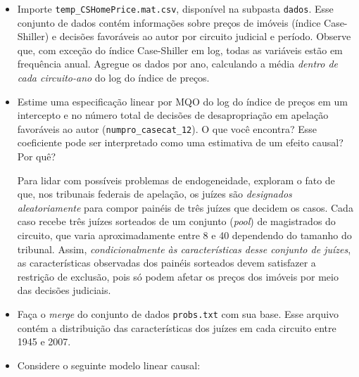 \documentclass[10pt,a4paper]{article}
\begin{document}
\begin{itemize}

\item[a] Importe \texttt{temp\_CSHomePrice.mat.csv}, disponível na subpasta \texttt{dados}. Esse conjunto de dados contém informações sobre preços de imóveis (índice Case-Shiller) e decisões favoráveis ao autor por circuito judicial e período. Observe que, com exceção do índice Case-Shiller em log, todas as variáveis estão em frequência anual. Agregue os dados por ano, calculando a média \emph{dentro de cada circuito-ano} do log do índice de preços.

\item[b] Estime uma especificação linear por MQO do log do índice de preços em um intercepto e  no número total de decisões de desapropriação em apelação favoráveis ao autor (\texttt{numpro\_casecat\_12}). O que você encontra? Esse coeficiente pode ser interpretado como uma estimativa de um efeito causal? Por quê?

\vspace{0.5em}

Para lidar com possíveis problemas de endogeneidade, \citet{chen2015growth} exploram o fato de que, nos tribunais federais de apelação, os juízes são \emph{designados aleatoriamente} para compor painéis de três juízes que decidem os casos. Cada caso recebe três juízes sorteados de um conjunto (\emph{pool}) de magistrados do circuito, que varia aproximadamente entre 8 e 40 dependendo do tamanho do tribunal. Assim, \emph{condicionalmente às características desse conjunto de juízes}, as características observadas dos painéis sorteados devem satisfazer a restrição de exclusão, pois só podem afetar os preços dos imóveis por meio das decisões judiciais.

\item[c] Faça o \emph{merge} do conjunto de dados \texttt{probs.txt} com sua base. Esse arquivo contém a distribuição das características dos juízes em cada circuito entre 1945 e 2007.

\item[d] Considere o seguinte modelo linear causal:


\end{itemize}
\end{document}
